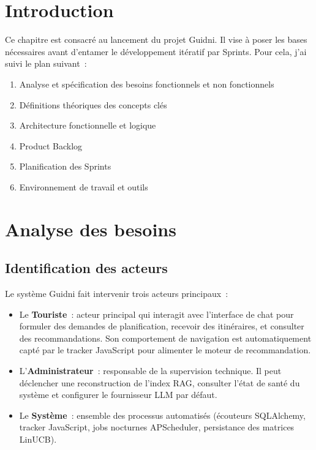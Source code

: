 
\section{Introduction}

Ce chapitre est consacré au lancement du projet Guidni. Il vise à poser les bases nécessaires
avant d'entamer le développement itératif par Sprints. Pour cela, j'ai suivi le plan suivant~:
\begin{enumerate}
    \item Analyse et spécification des besoins fonctionnels et non fonctionnels
    \item Définitions théoriques des concepts clés
    \item Architecture fonctionnelle et logique
    \item Product Backlog
    \item Planification des Sprints
    \item Environnement de travail et outils
\end{enumerate}


\section{Analyse des besoins}

\subsection{Identification des acteurs}

Le système Guidni fait intervenir trois acteurs principaux~:

\begin{itemize}
    \item Le \textbf{Touriste}~: acteur principal qui interagit avec l'interface de chat pour
    formuler des demandes de planification, recevoir des itinéraires, et consulter des
    recommandations. Son comportement de navigation est automatiquement capté par le tracker
    JavaScript pour alimenter le moteur de recommandation.

    \item L'\textbf{Administrateur}~: responsable de la supervision technique. Il peut
    déclencher une reconstruction de l'index RAG, consulter l'état de santé du système et
    configurer le fournisseur LLM par défaut.

    \item Le \textbf{Système}~: ensemble des processus automatisés (écouteurs SQLAlchemy,
    tracker JavaScript, jobs nocturnes APScheduler, persistance des matrices LinUCB).
\end{itemize}

